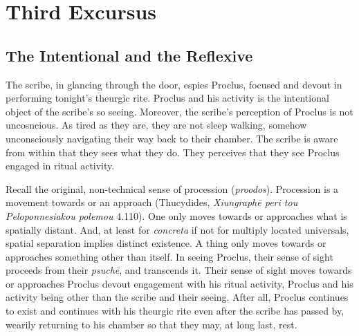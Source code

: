 \chapter{Third Excursus} %
\label{cha:third_excursus}

\section{The Intentional and the Reflexive} %
\label{sec:the_intentional_and_the_reflexive}

The scribe, in glancing through the door, espies Proclus, focused and devout in performing tonight's theurgic rite. Proclus and his activity is the intentional object of the scribe's so seeing. Moreover, the scribe's perception of Proclus is not uncosncious. As tired as they are, they are not sleep walking, somehow unconsciously navigating their way back to their chamber. The scribe is aware from within that they sees what they do. They perceives that they see Proclus engaged in ritual activity. 


Recall the original, non-technical sense of procession (\emph{proodos}). Procession is a movement towards or an approach (Thucydides, \emph{Xiungraphē peri tou Peloponnesiakou polemou} 4.110). One only moves towards or approaches what is spatially distant. And, at least for \emph{concreta} if not for multiply located universals, spatial separation implies distinct existence. A thing only moves towards or approaches something other than itself. In seeing Proclus, their sense of sight proceeds from their \emph {psuchē}, and transcends it. Their sense of sight moves towards or approaches Proclus devout engagement with his ritual activity, Proclus and his activity being other than the scribe and their seeing. After all, Proclus continues to exist and continues with his theurgic rite even after the scribe has passed by, wearily returning to his chamber so that they may, at long last, rest.

